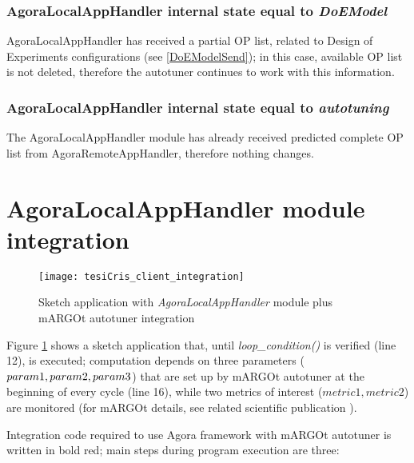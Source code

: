 \subsubsection{AgoraLocalAppHandler internal state equal to \textit{DoEModel}}

AgoraLocalAppHandler has received a partial OP list, related to Design of Experiments configurations (see \ref{DoEModelSend}); in this case, available OP list is not deleted, therefore the autotuner continues to work with this information.


\subsubsection{AgoraLocalAppHandler internal state equal to \textit{autotuning}}

The AgoraLocalAppHandler module has already received predicted complete OP list from AgoraRemoteAppHandler, therefore nothing changes.





\section{AgoraLocalAppHandler module integration}

\begin{figure}[H]

    \centering
    \texttt{[image: tesiCris\_client\_integration]}
    \caption{Sketch application with \textit{AgoraLocalAppHandler} module plus mARGOt autotuner integration}
    \label{fig::sketchApp}
    
\end{figure}

Figure \ref{fig::sketchApp} shows a sketch application that, until \textit{loop\_con\-di\-tion()} is verified (line 12), is executed; computation depends on three parameters ($pa\-ram1, pa\-ram2, pa\-ram3$) that are set up by mARGOt autotuner at the beginning of every cycle (line 16), while two metrics of interest ($metric1, metric2$) are monitored (for mARGOt details, see related scientific publication \cite{gadioli2015application}).

Integration code required to use Agora framework with mARGOt autotuner is written in bold red; main steps during program execution are three:

